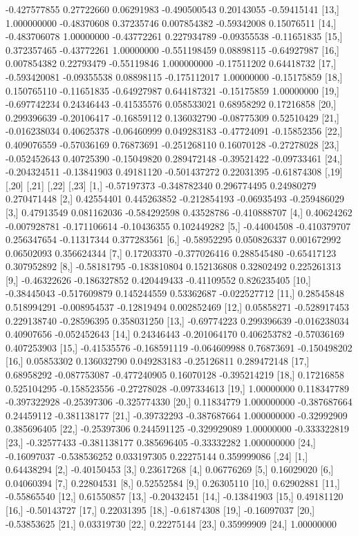 \documentclass[a4paper, 12pt]{article}
\begin{document}
\begin{Schunk}
\begin{Soutput}
[12,] -0.427577855  0.27722660  0.06291983 -0.490500543  0.20143055 -0.59415141
[13,]  1.000000000 -0.48370608  0.37235746  0.007854382 -0.59342008  0.15076511
[14,] -0.483706078  1.00000000 -0.43772261  0.227934789 -0.09355538 -0.11651835
[15,]  0.372357465 -0.43772261  1.00000000 -0.551198459  0.08898115 -0.64927987
[16,]  0.007854382  0.22793479 -0.55119846  1.000000000 -0.17511202  0.64418732
[17,] -0.593420081 -0.09355538  0.08898115 -0.175112017  1.00000000 -0.15175859
[18,]  0.150765110 -0.11651835 -0.64927987  0.644187321 -0.15175859  1.00000000
[19,] -0.697742234  0.24346443 -0.41535576  0.058533021  0.68958292  0.17216858
[20,]  0.299396639 -0.20106417 -0.16859112  0.136032790 -0.08775309  0.52510429
[21,] -0.016238034  0.40625378 -0.06460999  0.049283183 -0.47724091 -0.15852356
[22,]  0.409076559 -0.57036169  0.76873691 -0.251268110  0.16070128 -0.27278028
[23,] -0.052452643  0.40725390 -0.15049820  0.289472148 -0.39521422 -0.09733461
[24,] -0.204324511 -0.13841903  0.49181120 -0.501437272  0.22031395 -0.61874308
            [,19]        [,20]        [,21]       [,22]        [,23]
 [1,] -0.57197373 -0.348782340  0.296774495  0.24980279  0.270471448
 [2,]  0.42554401  0.445263852 -0.212854193 -0.06935493 -0.259486029
 [3,]  0.47913549  0.081162036 -0.584292598  0.43528786 -0.410888707
 [4,]  0.40624262 -0.007928781 -0.171106614 -0.10436355  0.102449282
 [5,] -0.44004508 -0.410379707  0.256347654 -0.11317344  0.377283561
 [6,] -0.58952295  0.050826337  0.001672992  0.06502093  0.356624344
 [7,]  0.17203370 -0.377026416  0.288545480 -0.65417123  0.307952892
 [8,] -0.58181795 -0.183810804  0.152136808  0.32802492  0.225261313
 [9,] -0.46322626 -0.186327852  0.420449433 -0.41109552  0.826235405
[10,] -0.38445043 -0.517609879  0.145244559  0.53362687 -0.022527712
[11,]  0.28545848  0.518994291 -0.008954537 -0.12819494  0.002852469
[12,]  0.05858271 -0.528917453  0.229138740 -0.28596395  0.358031250
[13,] -0.69774223  0.299396639 -0.016238034  0.40907656 -0.052452643
[14,]  0.24346443 -0.201064170  0.406253782 -0.57036169  0.407253903
[15,] -0.41535576 -0.168591119 -0.064609988  0.76873691 -0.150498202
[16,]  0.05853302  0.136032790  0.049283183 -0.25126811  0.289472148
[17,]  0.68958292 -0.087753087 -0.477240905  0.16070128 -0.395214219
[18,]  0.17216858  0.525104295 -0.158523556 -0.27278028 -0.097334613
[19,]  1.00000000  0.118347789 -0.397322928 -0.25397306 -0.325774330
[20,]  0.11834779  1.000000000 -0.387687664  0.24459112 -0.381138177
[21,] -0.39732293 -0.387687664  1.000000000 -0.32992909  0.385696405
[22,] -0.25397306  0.244591125 -0.329929089  1.00000000 -0.333322819
[23,] -0.32577433 -0.381138177  0.385696405 -0.33332282  1.000000000
[24,] -0.16097037 -0.538536252  0.033197305  0.22275144  0.359999086
            [,24]
 [1,]  0.64438294
 [2,] -0.40150453
 [3,]  0.23617268
 [4,]  0.06776269
 [5,]  0.16029020
 [6,]  0.04060394
 [7,]  0.22804531
 [8,]  0.52552584
 [9,]  0.26305110
[10,]  0.62902881
[11,] -0.55865540
[12,]  0.61550857
[13,] -0.20432451
[14,] -0.13841903
[15,]  0.49181120
[16,] -0.50143727
[17,]  0.22031395
[18,] -0.61874308
[19,] -0.16097037
[20,] -0.53853625
[21,]  0.03319730
[22,]  0.22275144
[23,]  0.35999909
[24,]  1.00000000
\end{Soutput}
\end{Schunk}
\end{document}
